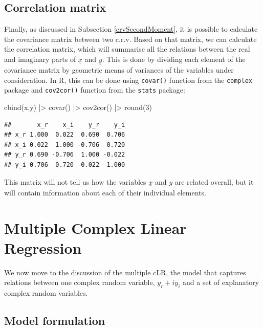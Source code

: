 \documentclass[
]{book}
\newenvironment{Shaded}{\begin{snugshade}}{\end{snugshade}}
\newcommand{\DecValTok}[1]{\textcolor[rgb]{0.00,0.00,0.81}{#1}}
\newcommand{\FunctionTok}[1]{\textcolor[rgb]{0.00,0.00,0.00}{#1}}
\newcommand{\NormalTok}[1]{#1}
\newcommand{\SpecialCharTok}[1]{\textcolor[rgb]{0.00,0.00,0.00}{#1}}
\begin{document}
\hypertarget{correlation-matrix}{%
\section{Correlation matrix}\label{correlation-matrix}}

Finally, as discussed in Subsection \ref{crvSecondMoment}, it is possible to calculate the covariance matrix between two c.r.v. Based on that matrix, we can calculate the correlation matrix, which will summarise all the relations between the real and imaginary parts of \(\underline{x}\) and \(\underline{y}\). This is done by dividing each element of the covariance matrix by geometric means of variances of the variables under consideration. In R, this can be done using \texttt{covar()} function from the \texttt{complex} package and \texttt{cov2cor()} function from the \texttt{stats} package:

\begin{Shaded}
\begin{Highlighting}[]
\FunctionTok{cbind}\NormalTok{(x,y) }\SpecialCharTok{|\textgreater{}} \FunctionTok{covar}\NormalTok{() }\SpecialCharTok{|\textgreater{}} \FunctionTok{cov2cor}\NormalTok{() }\SpecialCharTok{|\textgreater{}} \FunctionTok{round}\NormalTok{(}\DecValTok{3}\NormalTok{)}
\end{Highlighting}
\end{Shaded}

\begin{verbatim}
##       x_r    x_i    y_r    y_i
## x_r 1.000  0.022  0.690  0.706
## x_i 0.022  1.000 -0.706  0.720
## y_r 0.690 -0.706  1.000 -0.022
## y_i 0.706  0.720 -0.022  1.000
\end{verbatim}

This matrix will not tell us how the variables \(\underline{x}\) and \(\underline{y}\) are related overall, but it will contain information about each of their individual elements.

\hypertarget{multipleCLR}{%
\chapter{Multiple Complex Linear Regression}\label{multipleCLR}}

We now move to the discussion of the multiple cLR, the model that captures relations between one complex random variable, \(y_r + i y_i\) and a set of explanatory complex random variables.

\hypertarget{model-formulation}{%
\section{Model formulation}\label{model-formulation}}
\end{document}
